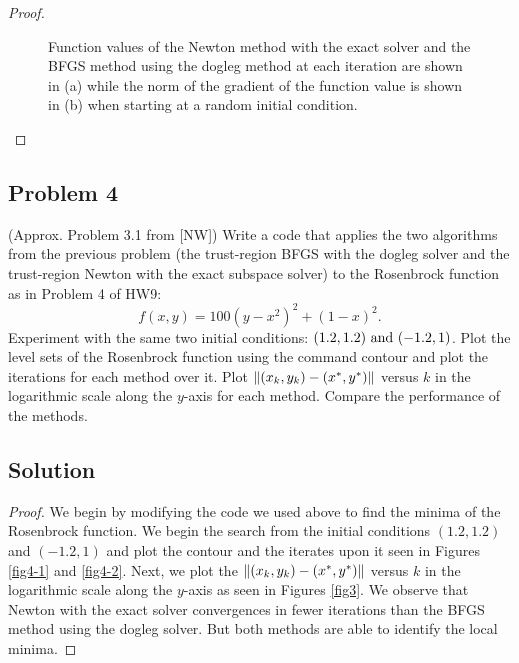 \documentclass[12pt]{report}
\begin{document}
\begin{problem}
\begin{proof}
\begin{figure}[H]
\begin{subfigure}[b]{0.5\linewidth}
        \caption{}
        \label{fig8:b}
        \vspace{4ex}
    \end{subfigure}
    \caption{Function values of the Newton method with the exact solver and the BFGS method using the dogleg method at each iteration are shown in (a) while the norm of the gradient of the function value is shown in (b) when starting at a random initial condition.}
    \label{fig8}
\end{figure}


\end{proof}
\end{problem}






\begin{problem}%
\subsection*{Problem 4}

(Approx. Problem 3.1 from [NW]) Write a code that applies the two algorithms from the previous problem (the trust-region BFGS with the dogleg solver and the trust-region Newton with the exact subspace solver) to the Rosenbrock function as in Problem 4 of HW9:
\[
    f (x, y) = 100(y - x^2)^2 + (1 - x)^2.
\]
Experiment with the same two initial conditions: $(1.2, 1.2) {~\text{and}~} (-1.2, 1)$. Plot the level sets of the Rosenbrock function using the command contour and plot the iterations for each method over it. Plot ${\left\|(x_k, y_k) - (x^*, y^*)\right\|}$ versus $k$ in the logarithmic scale along the $y$-axis for each method. Compare the performance of the methods.

\subsection*{Solution}
\begin{proof}
We begin by modifying the code we used above to find the minima of the Rosenbrock function. We begin the search from the initial conditions $(1.2,1.2)$ and $(-1.2,1)$ and plot the contour and the iterates upon it seen in Figures \ref{fig4-1} and \ref{fig4-2}. Next, we plot the ${\left\|(x_k, y_k) - (x^*, y^*)\right\|}$ versus $k$ in the logarithmic scale along the $y$-axis as seen in Figures \ref{fig3}. We observe that Newton with the exact solver convergences in fewer iterations than the BFGS method using the dogleg solver. But both methods are able to identify the local minima.


\end{proof}
\end{problem}
\end{document}
